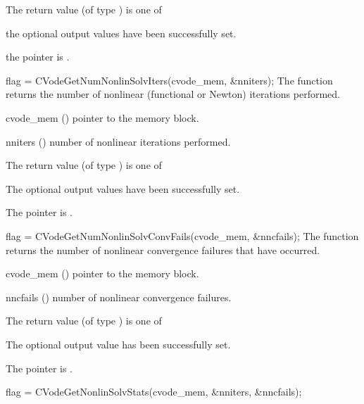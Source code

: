 {
  The return value  (of type ) is one of
  \begin{args}
  \item[\Id{CV\_SUCCESS}] 
    the optional output values have been successfully set.
  \item[\Id{CV\_MEM\_NULL}]
    the  pointer is .
  \end{args}
}
{}
{
  flag = CVodeGetNumNonlinSolvIters(cvode\_mem, \&nniters);
}
{
  The function  returns the
  number of nonlinear (functional or Newton) iterations performed. 
}
{
  \begin{args}
  \item[cvode\_mem] ()
    pointer to the {\cvode} memory block.
  \item[nniters] ()
    number of nonlinear iterations performed.
  \end{args}
}
{
  The return value  (of type ) is one of
  \begin{args}
  \item[\Id{CV\_SUCCESS}] 
    The optional output values have been successfully set.
  \item[\Id{CV\_MEM\_NULL}]
    The  pointer is .
  \end{args}
}
{}
{
  flag = CVodeGetNumNonlinSolvConvFails(cvode\_mem, \&nncfails);
}
{
  The function  returns the
  number of nonlinear convergence failures that have occurred.
}
{
  \begin{args}
  \item[cvode\_mem] ()
    pointer to the {\cvode} memory block.
  \item[nncfails] ()
    number of nonlinear convergence failures.
  \end{args}
}
{
  The return value  (of type ) is one of
  \begin{args}
  \item[\Id{CV\_SUCCESS}] 
    The optional output value has been successfully set.
  \item[\Id{CV\_MEM\_NULL}]
    The  pointer is .
  \end{args}
}
{}
{
  flag = CVodeGetNonlinSolvStats(cvode\_mem, \&nniters, \&nncfails);
}
